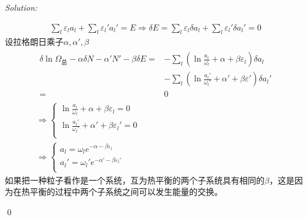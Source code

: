\documentclass[12pt,a4paper]{article}
\newenvironment{sol}
    {\emph{Solution:}
    }
    {
    \qed
    }
\begin{document}
\begin{sol}
\begin{gather}
\sum_l\varepsilon_la_l+\sum_l\varepsilon_l'a_l'=E\Longrightarrow\delta E=\sum_l\varepsilon_l\delta a_l+\sum_l\varepsilon_l'\delta a_l'=0
\end{gather}
设拉格朗日乘子$\alpha,\alpha',\beta$
\begin{gather}
\begin{align}
\nonumber\delta\ln\Omega_{\text{总}}-\alpha\delta N-\alpha'N'-\beta\delta E=&-\sum_l\left(\ln\frac{a_l}{\omega_l}+\alpha+\beta\varepsilon_l\right)\delta a_l\\
\nonumber&-\sum_l\left(\ln\frac{a_l'}{\omega_l'}+\alpha'+\beta\varepsilon'\right)\delta a_l'\\
=&0
\end{align}\\
\Longrightarrow\left\{\begin{array}{l}
\ln\frac{a_l}{\omega_l}+\alpha+\beta\varepsilon_l=0\\
\ln\frac{a_l'}{\omega_l'}+\alpha'+\beta\varepsilon_l'=0\\
\end{array}\right.\\
\Longrightarrow\left\{\begin{array}{l}
a_l=\omega_le^{-\alpha-\beta\varepsilon_l}\\
a_l'=\omega_l'e^{-\alpha'-\beta\varepsilon_l'}\\
\end{array}\right.
\end{gather}
如果把一种粒子看作是一个系统，互为热平衡的两个子系统具有相同的$\beta$，这是因为在热平衡的过程中两个子系统之间可以发生能量的交换。
\end{sol}
\end{document}
